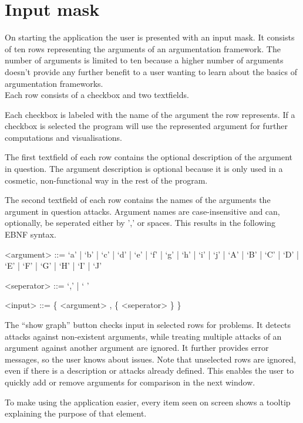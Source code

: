 \documentclass[draft,final]{vutinfth} %
\newcommand{\hl}{\par\vspace{6pt}} %
\begin{document}
\section{Input mask}
On starting the application the user is presented with an input mask. It consists of ten rows representing the arguments of an argumentation framework. The number of arguments is limited to ten because a higher number of arguments doesn't provide any further benefit to a user wanting to learn about the basics of argumentation frameworks.\\
Each row consists of a checkbox and two textfields.\hl
Each checkbox is labeled with the name of the argument the row represents. If a checkbox is selected the program will use the represented argument for further computations and visualisations.\hl
The first textfield of each row contains the optional description of the argument in question. The argument description is optional because it is only used in a cosmetic, non-functional way in the rest of the program.\hl
The second textfield of each row contains the names of the arguments the argument in question attacks. Argument names are case-insensitive and can, optionally, be seperated either by ',' or spaces. This results in the following EBNF syntax.\hl %

\begin{grammar}%
	<argument> ::= `a' | `b' | `c' | `d' | `e' | `f'
				| `g' | `h' | `i' | `j' | `A' | `B'
				| `C' | `D' | `E' | `F' | `G' | `H'
				| `I' | `J'

	<seperator> ::= `,' | ` '
	
	<input> ::= \{ <argument> , \{ <seperator> \} \}
\end{grammar}\hl

The ``show graph'' button checks input in selected rows for problems. It detects attacks against non-existent arguments, while treating multiple attacks of an argument against another argument are ignored. It further provides error messages, so the user knows about issues. Note that unselected rows are ignored, even if there is a description or attacks already defined. This enables the user to quickly add or remove arguments for comparison in the next window.\hl
To make using the application easier, every item seen on screen shows a tooltip explaining the purpose of that element.
\end{document}
